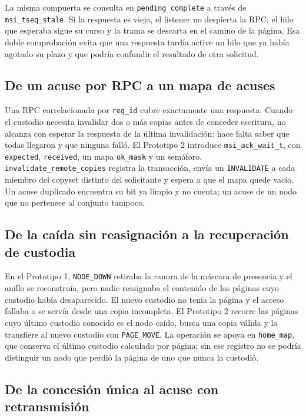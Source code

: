 \documentclass[11pt,spanish]{article}
\begin{document}
La misma compuerta se consulta en \texttt{pending\_complete} a través de \texttt{msi\_tseq\_stale}. Si la respuesta es vieja, el listener no despierta la RPC; el hilo que esperaba sigue su curso y la trama se descarta en el camino de la página. Esa doble comprobación evita que una respuesta tardía active un hilo que ya había agotado su plazo y que podría confundir el resultado de otra solicitud.

\subsection{De un acuse por RPC a un mapa de acuses}

Una RPC correlacionada por \texttt{req\_id} cubre exactamente una respuesta. Cuando el custodio necesita invalidar dos o más copias antes de conceder escritura, no alcanza con esperar la respuesta de la última invalidación: hace falta saber que todas llegaron y que ninguna falló. El Prototipo 2 introduce \texttt{msi\_ack\_wait\_t}, con \texttt{expected}, \texttt{received}, un mapa \texttt{ok\_mask} y un semáforo. \texttt{invalidate\_remote\_copies} registra la transacción, envía un \texttt{INVALIDATE} a cada miembro del copyset distinto del solicitante y espera a que el mapa quede vacío. Un acuse duplicado encuentra su bit ya limpio y no cuenta; un acuse de un nodo que no pertenece al conjunto tampoco.

\subsection{De la caída sin reasignación a la recuperación de custodia}

En el Prototipo 1, \texttt{NODE\_DOWN} retiraba la ranura de la máscara de presencia y el anillo se reconstruía, pero nadie reasignaba el contenido de las páginas cuyo custodio había desaparecido. El nuevo custodio no tenía la página y el acceso fallaba o se servía desde una copia incompleta. El Prototipo 2 recorre las páginas cuyo último custodio conocido es el nodo caído, busca una copia válida y la transfiere al nuevo custodio con \texttt{PAGE\_MOVE}. La operación se apoya en \texttt{home\_map}, que conserva el último custodio calculado por página; sin ese registro no se podría distinguir un nodo que perdió la página de uno que nunca la custodió.

\subsection{De la concesión única al acuse con retransmisión}
\end{document}
